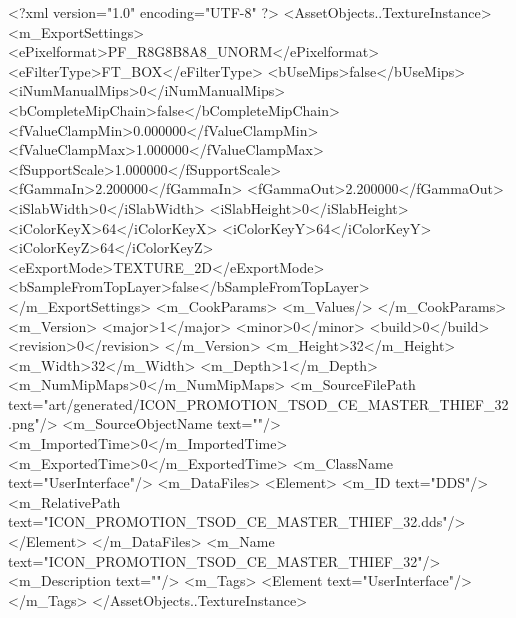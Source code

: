 <?xml version="1.0" encoding="UTF-8" ?>
<AssetObjects..TextureInstance>
	<m_ExportSettings>
		<ePixelformat>PF_R8G8B8A8_UNORM</ePixelformat>
		<eFilterType>FT_BOX</eFilterType>
		<bUseMips>false</bUseMips>
		<iNumManualMips>0</iNumManualMips>
		<bCompleteMipChain>false</bCompleteMipChain>
		<fValueClampMin>0.000000</fValueClampMin>
		<fValueClampMax>1.000000</fValueClampMax>
		<fSupportScale>1.000000</fSupportScale>
		<fGammaIn>2.200000</fGammaIn>
		<fGammaOut>2.200000</fGammaOut>
		<iSlabWidth>0</iSlabWidth>
		<iSlabHeight>0</iSlabHeight>
		<iColorKeyX>64</iColorKeyX>
		<iColorKeyY>64</iColorKeyY>
		<iColorKeyZ>64</iColorKeyZ>
		<eExportMode>TEXTURE_2D</eExportMode>
		<bSampleFromTopLayer>false</bSampleFromTopLayer>
	</m_ExportSettings>
	<m_CookParams>
		<m_Values/>
	</m_CookParams>
	<m_Version>
		<major>1</major>
		<minor>0</minor>
		<build>0</build>
		<revision>0</revision>
	</m_Version>
	<m_Height>32</m_Height>
	<m_Width>32</m_Width>
	<m_Depth>1</m_Depth>
	<m_NumMipMaps>0</m_NumMipMaps>
	<m_SourceFilePath text="art/generated/ICON_PROMOTION_TSOD_CE_MASTER_THIEF_32.png"/>
	<m_SourceObjectName text=""/>
	<m_ImportedTime>0</m_ImportedTime>
	<m_ExportedTime>0</m_ExportedTime>
	<m_ClassName text="UserInterface"/>
	<m_DataFiles>
		<Element>
			<m_ID text="DDS"/>
			<m_RelativePath text="ICON_PROMOTION_TSOD_CE_MASTER_THIEF_32.dds"/>
		</Element>
	</m_DataFiles>
	<m_Name text="ICON_PROMOTION_TSOD_CE_MASTER_THIEF_32"/>
	<m_Description text=""/>
	<m_Tags>
		<Element text="UserInterface"/>
	</m_Tags>
</AssetObjects..TextureInstance>
